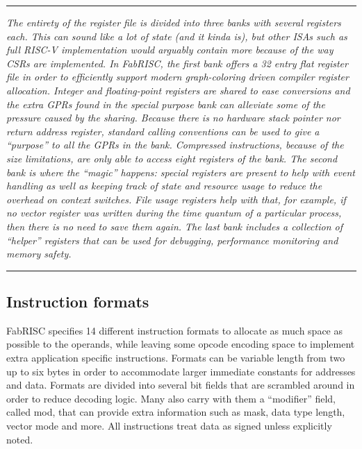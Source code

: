        \par\noindent\rule{\textwidth}{0.4pt}
        \textit{The entirety of the register file is divided into three banks with several registers each. This can sound like a lot of state (and it kinda is), but other ISAs such as full RISC-V implementation would arguably contain more because of the way CSRs are implemented. In FabRISC, the first bank offers a 32 entry flat register file in order to efficiently support modern graph-coloring driven compiler register allocation. Integer and floating-point registers are shared to ease conversions and the extra GPRs found in the special purpose bank can alleviate some of the pressure caused by the sharing. Because there is no hardware stack pointer nor return address register, standard calling conventions can be used to give a ``purpose'' to all the GPRs in the bank. Compressed instructions, because of the size limitations, are only able to access eight registers of the bank. The second bank is where the ``magic'' happens: special registers are present to help with event handling as well as keeping track of state and resource usage to reduce the overhead on context switches. File usage registers help with that, for example, if no vector register was written during the time quantum of a particular process, then there is no need to save them again. The last bank includes a collection of ``helper'' registers that can be used for debugging, performance monitoring and memory safety.}
        \par\noindent\rule{\textwidth}{0.4pt}

        \subsection{Instruction formats}

            \vspace{10pt}

            FabRISC specifies 14 different instruction formats to allocate as much space as possible to the operands, while leaving some opcode encoding space to implement extra application specific instructions. Formats can be variable length from two up to six bytes in order to accommodate larger immediate constants for addresses and data. Formats are divided into several bit fields that are scrambled around in order to reduce decoding logic. Many also carry with them a ``modifier'' field, called mod, that can provide extra information such as mask, data type length, vector mode and more. All instructions treat data as signed unless explicitly noted.

